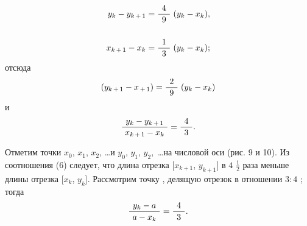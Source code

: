 \begin{minipage}[t]{0.45\linewidth}
\begin{align}
    y_k - y_{k\hspace{0.5mm}+\hspace{0.5mm}1} = \frac{\hspace{1.5mm}4\hspace{1.5mm}}{9}\hspace{1mm}(y_k - x_k), \\
    \nonumber\\
    x_{k\hspace{0.5mm}+\hspace{0.5mm}1} - x_k = \frac{\hspace{1.5mm}1\hspace{1.5mm}}{3}\hspace{1mm}(y_k - x_k);
\end{align}
отсюда
\begin{align}
    (y_{k\hspace{0.5mm}+\hspace{0.5mm}1} - x_{\hspace{0.5mm}+\hspace{0.5mm}1}) = \frac{\hspace{1.5mm}2\hspace{1.5mm}}{9}\hspace{1mm}(y_k - x_k)
\end{align}
\bigskip
и
\begin{equation}
    \frac{\hspace{1.5mm}y_k - y_{k\hspace{0.5mm}+\hspace{0.5mm}1}\hspace{1.5mm}}{x_{k\hspace{0.5mm}+\hspace{0.5mm}1} - x_k} = \frac{\hspace{1.5mm}4\hspace{1.5mm}}{3}.
\end{equation}

Отметим точки \hspace{1mm}$x_0$, \hspace{1mm}$x_1$, \hspace{1mm}$x_2$, \ldots и \hspace{1mm}$y_0$, \hspace{1mm}$y_1$, \hspace{1mm}$y_2,$ \ldots \hspace{1mm}на числовой оси (рис. 9 и 10). Из соотношения (6) следует, что длина отрезка $[x_{k + 1}$, \hspace{1mm}$y_{k + 1}]$ в $4$ $\frac{1}{2}$ раза меньше длины отрезка [$x_k$, \hspace{1mm}$y_k$]. Рассмотрим точку  , делящую отрезок  в отношении $3:4$ ; тогда
\begin{equation}
    \frac{\hspace{1.5mm}y_k - a\hspace{1.5mm}}{a - x_k} = \frac{\hspace{1.5mm}4\hspace{1.5mm}}{3}.
\end{equation}


\end{minipage}
